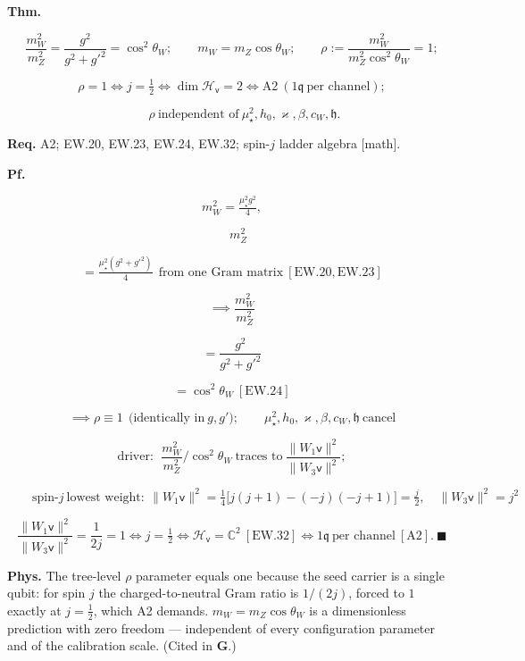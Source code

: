 \begin{theorem}\label{tag:EW-34}
\textbf{Thm.}

\[
\frac{m_W^2}{m_Z^2}=\frac{g^2}{g^2+g'^2}=\cos^2\theta_W;\qquad
m_W=m_Z\cos\theta_W;\qquad
\rho:=\frac{m_W^2}{m_Z^2\cos^2\theta_W}=1;
\]

\[
\rho=1\iff j=\tfrac12\iff\dim\mathcal H_{\mathsf v}=2\iff\mathrm{A2}\ (1\mathfrak q\ \text{per channel});
\]

\[
\qquad \rho\ \text{independent of}\ \mu_\star^2,h_0,\varkappa,\beta,c_W,\mathfrak h .
\]

\textbf{Req.} A2; EW.20, EW.23, EW.24, EW.32; spin-$j$ ladder algebra [math].

\textbf{Pf.}

\[
m_W^2=\tfrac{\mu_\star^2g^2}4,
\]

\[
\quad m_Z^2
\]

\[
= \tfrac{\mu_\star^2(g^2+g'^2)}4\ \ \text{from one Gram matrix}\ [\mathrm{EW.20},\mathrm{EW.23}]
\]

\[
\implies \frac{m_W^2}{m_Z^2}
\]

\[
= \frac{g^2}{g^2+g'^2}
\]

\[
= \cos^2\theta_W\ [\mathrm{EW.24}]
\]

\[
\implies\rho\equiv1\ \ \text{(identically in}\ g,g');\qquad\mu_\star^2,h_0,\varkappa,\beta,c_W,\mathfrak h\ \text{cancel}
\]

\[
\text{driver}:\ \ \frac{m_W^2}{m_Z^2}\Big/\cos^2\theta_W\ \text{traces to}\ \frac{\|W_1\mathsf v\|^2}{\|W_3\mathsf v\|^2};
\]

\[
\qquad \text{spin-}j\ \text{lowest weight}:\ \|W_1\mathsf v\|^2=\tfrac14\bigl[j(j{+}1)-(-j)(-j{+}1)\bigr]=\tfrac j2,\quad\|W_3\mathsf v\|^2=j^2
\]

\[
\frac{\|W_1\mathsf v\|^2}{\|W_3\mathsf v\|^2}=\frac{1}{2j}=1\iff j=\tfrac12\iff\mathcal H_{\mathsf v}=\mathbb C^2\ [\mathrm{EW.32}]\iff1\mathfrak q\ \text{per channel}\ [\mathrm{A2}].\ \blacksquare
\]

\textbf{Phys.} The tree-level $\rho$ parameter equals one because the seed carrier is a single qubit: for spin $j$ the charged-to-neutral Gram ratio is $1/(2j)$, forced to $1$ exactly at $j=\tfrac12$, which A2 demands. $m_W=m_Z\cos\theta_W$ is a dimensionless prediction with zero freedom — independent of every configuration parameter and of the calibration scale. (Cited in \textbf{G}.)

\end{theorem}

